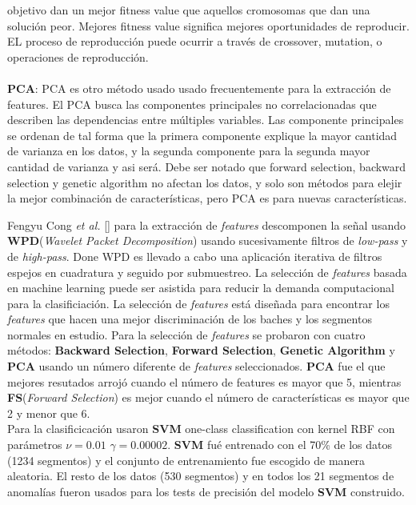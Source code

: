 objetivo dan un mejor fitness value que aquellos cromosomas que dan una solución peor. Mejores fitness value significa mejores oportunidades de reproducir. EL proceso 
de reproducción puede ocurrir a través de crossover, mutation, o operaciones de reproducción. 
\\\\
\textbf{PCA}: PCA es otro método usado usado frecuentemente para la extracción de features. El PCA busca las componentes principales no correlacionadas que describen 
las dependencias entre múltiples variables. Las componente principales se ordenan de tal forma que la primera componente explique la mayor cantidad de varianza en los
datos, y la segunda componente para la segunda mayor cantidad de varianza y asi será.  Debe ser notado que forward selection, backward selection y genetic algorithm 
no afectan los datos, y solo son métodos para elejir la mejor combinación de características, pero PCA es para nuevas características. 


Fengyu Cong {\it et al.} [] para la extracción de \emph{features} descomponen la señal usando \textbf{WPD}(\emph{Wavelet Packet Decomposition}) usando
sucesivamente filtros de \emph{low-pass} y de \emph{high-pass}. Done WPD es llevado a cabo una aplicación iterativa de filtros espejos en cuadratura y seguido por
submuestreo. La selección de \emph{features} basada en machine learning puede ser asistida para reducir la demanda computacional para la clasificiación.
La selección de \emph{features} está diseñada para encontrar los \emph{features} que hacen una mejor discriminación de los baches y los segmentos
normales en estudio. Para la selección de \emph{features} se probaron con cuatro métodos: \textbf{Backward Selection}, \textbf{Forward Selection},
\textbf{Genetic Algorithm} y \textbf{PCA} usando un número diferente de \emph{features} seleccionados. \textbf{PCA} fue el que mejores resutados arrojó
cuando el número de features es mayor que 5, mientras \textbf{FS}(\emph{Forward Selection}) es mejor cuando el número de características es mayor
que 2 y menor que 6. \\
Para la clasificicación usaron \textbf{SVM} one-class classification con kernel RBF con parámetros  $\nu = 0.01$  $\gamma = 0.00002$. \textbf{SVM} fué
entrenado con el 70\%  de los datos (1234 segmentos) y el conjunto de entrenamiento fue escogido de manera aleatoria. El resto de los datos  (530 segmentos)
y en todos los 21 segmentos de anomalías fueron usados para los tests de precisión del modelo \textbf{SVM} construido. 

